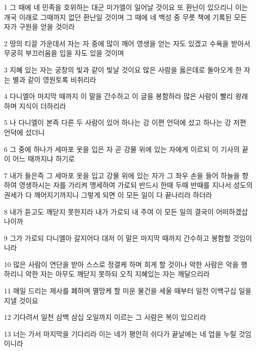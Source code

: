 \par 1 그 때에 네 민족을 호위하는 대군 미가엘이 일어날 것이요 또 환난이 있으리니 이는 개국 이래로 그때까지 없던 환난일 것이며 그 때에 네 백성 중 무릇 책에 기록된 모든 자가 구원을 얻을 것이라
\par 2 땅의 티끌 가운데서 자는 자 중에 많이 깨어 영생을 얻는 자도 있겠고 수욕을 받아서 무궁히 부끄러움을 입을 자도 있을 것이며
\par 3 지혜 있는 자는 궁창의 빛과 같이 빛날 것이요 많은 사람을 옳은데로 돌아오게 한 자는 별과 같이 영원토록 비취리라
\par 4 다니엘아 마지막 때까지 이 말을 간수하고 이 글을 봉함하라 많은 사람이 빨리 왕래하며 지식이 더하리라
\par 5 나 다니엘이 본즉 다른 두 사람이 있어 하나는 강 이편 언덕에 섰고 하나는 강 저편 언덕에 섰더니
\par 6 그 중에 하나가 세마포 옷을 입은 자 곧 강물 위에 있는 자에게 이르되 이 기사의 끝이 어느 때까지냐 하기로
\par 7 내가 들은즉 그 세마포 옷을 입고 강물 위에 있는 자가 그 좌우 손을 들어 하늘을 향하여 영생하시는 자를 가리켜 맹세하여 가로되 반드시 한때 두때 반때를 지나서 성도의 권세가 다 깨어지기까지니 그렇게 되면 이 모든 일이 다 끝나리라 하더라
\par 8 내가 듣고도 깨닫지 못한지라 내가 가로되 내 주여 이 모든 일의 결국이 어떠하겠삽나이까
\par 9 그가 가로되 다니엘아 갈지어다 대저 이 말은 마지막 때까지 간수하고 봉함할 것임이니라
\par 10 많은 사람이 연단을 받아 스스로 정결케 하며 희게 할 것이나 악한 사람은 악을 행하리니 악한 자는 아무도 깨닫지 못하되 오직 지혜있는 자는 깨달으리라
\par 11 매일 드리는 제사를 폐하며 멸망케 할 미운 물건을 세울 때부터 일천 이백구십 일을 지낼 것이요
\par 12 기다려서 일천 삼백 삼십 오일까지 이르는 그 사람은 복이 있으리라
\par 13 너는 가서 마지막을 기다리라 이는 네가 평안히 쉬다가 끝날에는 네 업을 누릴 것임이니라


